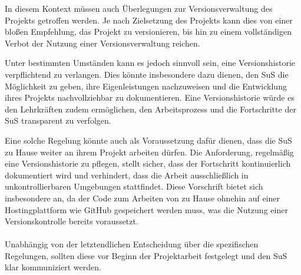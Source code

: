 \documentclass[a4paper,12pt]{article}
\begin{document}
In diesem Kontext müssen auch Überlegungen zur Versionsverwaltung des Projekts getroffen werden. Je nach Zielsetzung des Projekts kann dies von einer bloßen Empfehlung, das Projekt zu versionieren, bis hin zu einem vollständigen Verbot der Nutzung einer Versionsverwaltung reichen.

Unter bestimmten Umständen kann es jedoch sinnvoll sein, eine Versionshistorie verpflichtend zu verlangen. Dies könnte insbesondere dazu dienen, den SuS die Möglichkeit zu geben, ihre Eigenleistungen nachzuweisen und die Entwicklung ihres Projekts nachvollziehbar zu dokumentieren. Eine Versionshistorie würde es den Lehrkräften zudem ermöglichen, den Arbeitsprozess und die Fortschritte der SuS transparent zu verfolgen.

Eine solche Regelung könnte auch als Voraussetzung dafür dienen, dass die SuS zu Hause weiter an ihrem Projekt arbeiten dürfen. Die Anforderung, regelmäßig eine Versionshistorie zu pflegen, stellt sicher, dass der Fortschritt kontinuierlich dokumentiert wird und verhindert, dass die Arbeit ausschließlich in unkontrollierbaren Umgebungen stattfindet. Diese Vorschrift bietet sich insbesondere an, da der Code zum Arbeiten von zu Hause ohnehin auf einer Hostingplattform wie GitHub gespeichert werden muss, was die Nutzung einer Versionskontrolle bereits voraussetzt.\\
\\

Unabhängig von der letztendlichen Entscheidung über die spezifischen Regelungen, sollten diese vor Beginn der Projektarbeit festgelegt und den SuS klar kommuniziert werden. 
\end{document}
